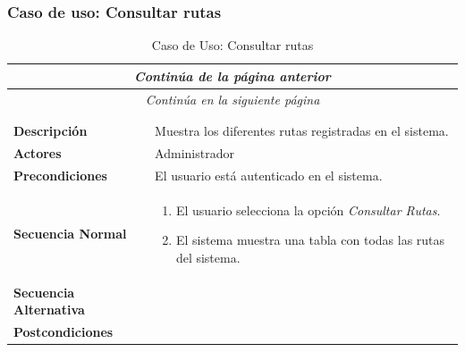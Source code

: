\newpage
\subsubsection*{Caso de uso: Consultar rutas }
\begin{longtable}{| p{4cm} | p{10cm} |}
\endfirsthead
\multicolumn{2}{c}{\textit{Continúa de la página anterior}}\\[12pt]
\hline
\endhead
\hline
\multicolumn{2}{c}{\textit{Continúa en la siguiente página}} \\
\endfoot
\hline
\caption{Caso de Uso: Consultar rutas}\label{fig:1}\\
\endlastfoot


\hline
\multicolumn{2}{|c|}{\textbf{CU$<$26$>$ - Consultar Rutas}} \\

\hline
\textbf{Descripción} &
Muestra los diferentes rutas registradas en el sistema.\\

\hline
\textbf{Actores} &
Administrador\\

\hline
\textbf{Precondiciones} &
El usuario está autenticado en el sistema.\\

\hline
\textbf{Secuencia Normal} &\mbox{}\par\vspace{-\baselineskip}
\begin{enumerate}[leftmargin=0.7cm, topsep=0.1cm]
\item El usuario selecciona la opción \textit{Consultar Rutas}.
\item El sistema muestra una tabla con todas las rutas del sistema.
\end{enumerate}


\\
\hline
\textbf{Secuencia Alternativa} &\mbox{}\par\vspace{-\baselineskip}
\\

\hline
\textbf{Postcondiciones} & \\
\hline
\end{longtable}



\newpage
